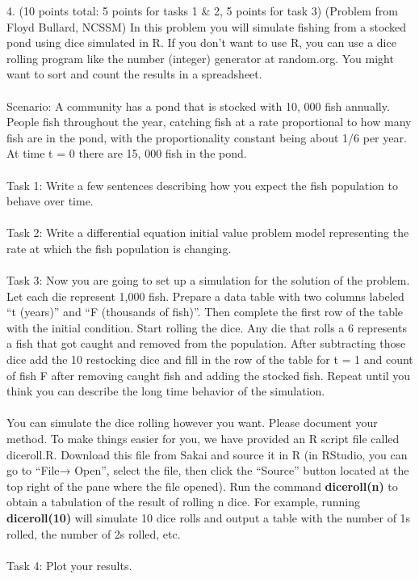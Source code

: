 \documentclass[12pt,letterpaper]{hmcpset}
\begin{document}
\begin{problem}
4. (10 points total: 5 points for tasks 1 \& 2, 5 points for task 3) (Problem from Floyd Bullard,
NCSSM) In this problem you will simulate fishing from a stocked pond using dice simulated
in R. If you don’t want to use R, you can use a dice rolling program like the number (integer)
generator at random.org. You might want to sort and count the results in a spreadsheet.\\\\
Scenario: A community has a pond that is stocked with 10, 000 fish annually. People fish
throughout the year, catching fish at a rate proportional to how many fish are in the pond,
with the proportionality constant being about 1/6 per year. At time t = 0 there are 15, 000
fish in the pond.\\\\
Task 1: Write a few sentences describing how you expect the fish population to behave over
time.\\\\
Task 2: Write a differential equation initial value problem model representing the rate at
which the fish population is changing.\\\\
Task 3: Now you are going to set up a simulation for the solution of the problem. Let each
die represent 1,000 fish. Prepare a data table with two columns labeled “t (years)” and “F
(thousands of fish)”. Then complete the first row of the table with the initial condition. Start
rolling the dice. Any die that rolls a 6 represents a fish that got caught and removed from
the population. After subtracting those dice add the 10 restocking dice and fill in the row
of the table for t = 1 and count of fish F after removing caught fish and adding the stocked
fish. Repeat until you think you can describe the long time behavior of the simulation.\\\\
You can simulate the dice rolling however you want. Please document your method. To
make things easier for you, we have provided an R script file called diceroll.R. Download
this file from Sakai and source it in R (in RStudio, you can go to “File→ Open”, select
the file, then click the “Source” button located at the top right of the pane where the file
opened). Run the command \textbf{diceroll(n)} to obtain a tabulation of the result of rolling n
dice. For example, running \textbf{diceroll(10)} will simulate 10 dice rolls and output a table with
the number of 1s rolled, the number of 2s rolled, etc.\\\\
Task 4: Plot your results.\\
\end{problem}
\newpage
\end{document}
